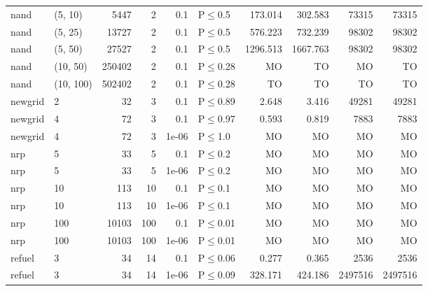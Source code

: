 \begin{longtable}{llrrrlrrrr}
 nand          & (5, 10)   &   	5447 &   2 & 0.1   & P$\leq$0.5   & 173.014  & 302.583  & 73315   & 73315   \\
 nand          & (5, 25)   &  	13727 &   2 & 0.1   & P$\leq$0.5   & 576.223  & 732.239  & 98302   & 98302   \\
 nand          & (5, 50)   &  	27527 &   2 & 0.1   & P$\leq$0.5   & 1296.513 & 1667.763 & 98302   & 98302   \\
 nand          & (10, 50)  & 	250402 &   2 & 0.1   & P$\leq$0.28  & MO       & TO       & MO      & TO      \\
 nand          & (10, 100) & 	502402 &   2 & 0.1   & P$\leq$0.28  & TO       & TO       & TO      & TO      \\
 newgrid       & 2         &     	32 &   3 & 0.1   & P$\leq$0.89  & 2.648    & 3.416    & 49281   & 49281   \\
 newgrid       & 4         &     	72 &   3 & 0.1   & P$\leq$0.97  & 0.593    & 0.819    & 7883    & 7883    \\
 newgrid       & 4         &     	72 &   3 & 1e-06 & P$\leq$1.0   & MO       & MO       & MO      & MO      \\
 nrp           & 5         &     	33 &   5 & 0.1   & P$\leq$0.2   & MO       & MO       & MO      & MO      \\
 nrp           & 5         &     	33 &   5 & 1e-06 & P$\leq$0.2   & MO       & MO       & MO      & MO      \\
 nrp           & 10        &    	113 &  10 & 0.1   & P$\leq$0.1   & MO       & MO       & MO      & MO      \\
 nrp           & 10        &    	113 &  10 & 1e-06 & P$\leq$0.1   & MO       & MO       & MO      & MO      \\
 nrp           & 100       &  	10103 & 100 & 0.1   & P$\leq$0.01  & MO       & MO       & MO      & MO      \\
 nrp           & 100       &  	10103 & 100 & 1e-06 & P$\leq$0.01  & MO       & MO       & MO      & MO      \\
 refuel        & 3         &     	34 &  14 & 0.1   & P$\leq$0.06  & 0.277    & 0.365    & 2536    & 2536    \\
 refuel        & 3         &     	34 &  14 & 1e-06 & P$\leq$0.09  & 328.171  & 424.186  & 2497516 & 2497516 \\
\bottomrule
\end{longtable}
